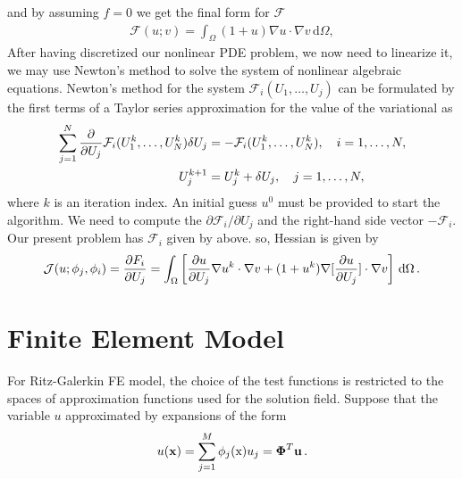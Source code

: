\documentclass[]{article}
\begin{document}
and by assuming $f=0$ we get the final form for $\mathcal{F}$
\begin{equation}\label{eq10}
	\begin{aligned}
		\mathcal{F}(u; v) = \int_\Omega (1+u)\nabla u\cdot \nabla v \, \mathrm{d}\Omega,
	\end{aligned}
\end{equation}
After having discretized our nonlinear PDE problem, we now need to linearize it, we may use Newton’s method to solve the system of nonlinear algebraic equations. Newton’s method for the system $\mathcal{F}_i(U_1,\ldots,U_j)$ can be formulated by the first terms of a Taylor series approximation for the value of the variational as
\begin{equation}\label{eq11}
	\begin{aligned}
		\sum_{j=1}^N {\partial \over\partial U_j} \mathcal{F}_i(U_1^k,\ldots,U_N^k)\delta U_j &= -\mathcal{F}_i(U_1^k,\ldots,U_N^k),\quad i=1, \ldots ,N,\\ U_j^{k+1} &= U_j^k + \delta U_j,\quad j=1, \ldots ,N,
	\end{aligned}
\end{equation}
where $k$ is an iteration index. An initial guess $u^0$ must be provided to start the algorithm. We need to compute the $\partial \mathcal{F}_i/\partial U_j$ and the right-hand side vector $-\mathcal{F}_i$. Our present problem has $\mathcal{F}_i$ given by above. so, Hessian is given by
\begin{equation}\label{eq12}
	\begin{aligned}
		\mathcal{J}(u;\phi_j,\phi_i) = {\partial F_i\over\partial U_j} = \int_\Omega \left\lbrack \frac{\partial u}{\partial U_j} \nabla u^k \cdot \nabla v + (1+u^k) \nabla [\frac{\partial u}{\partial U_j}] \cdot \nabla v \right\rbrack \, \mathrm{d}\Omega\thinspace .
	\end{aligned}
\end{equation}
\section{Finite Element Model} \label{sec: fem}
For Ritz-Galerkin FE model, the choice of the test functions is restricted to the spaces of approximation functions used for the solution field. Suppose that the variable $u$ approximated by expansions of the form
\begin{equation}\label{eq13}
	\begin{aligned}
		u(\mathbf{x})= \sum_{j=1}^{M} \phi_j(\mathrm{x}) u_j = \boldsymbol{\Phi}^T\mathbf{u} \thinspace.
	\end{aligned}
\end{equation}
\end{document}
